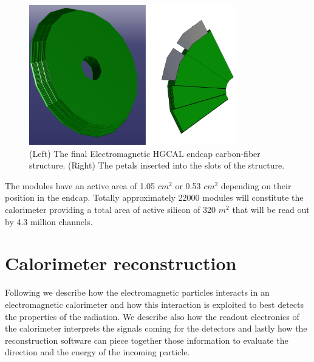 \begin{figure}
\centerline{\includegraphics[width=0.8\textwidth]{intro/hgcalStruct.png}}
\caption{(Left) The final Electromagnetic HGCAL endcap carbon-fiber structure. (Right) The petals inserted into the slots of the structure.}
\label{hgcalStruct}
\end{figure}

The modules have an active area of 1.05 $\unit{cm^2}$ or 0.53 $\unit{cm^2}$ depending on their position in the endcap. Totally approximately 22000 modules will constitute the calorimeter providing a total area of active silicon of 320 $\unit{m^2}$ that will be read out by 4.3 million channels.\\


\section{Calorimeter reconstruction}\label{sec:hgcal_clustering}
Following we describe how the electromagnetic particles interacts in an electromagnetic calorimeter and how this interaction is exploited to best detects the properties of the radiation. We describe also how the readout electronics of the calorimeter interprets the signals coming for the detectors and lastly how the reconstruction software can piece together those information to evaluate the direction and the energy of the incoming particle.

